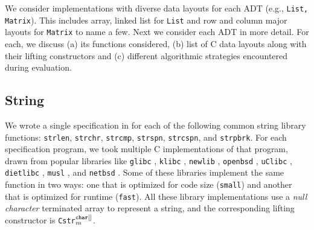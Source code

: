 We consider implementations with diverse data layouts
for each \SpecL{} ADT (e.g., {\tt List, Matrix}).
This includes array, linked list for {\tt List} and
row and column major layouts for {\tt Matrix} to name a few.
Next we consider each ADT in more detail. For each, we discuss
(a) its functions considered, (b) list of C data layouts along with
their lifting constructors and (c) different algorithmic strategies
encountered during evaluation.




\subsection{String} We wrote a single specification in \SpecL{} for each of the
following
common string library functions: {\tt strlen}, {\tt strchr}, {\tt strcmp}, {\tt strspn},
{\tt strcspn}, and {\tt strpbrk}.  For each specification
program, we took multiple C implementations of that program, drawn from popular
libraries like {\tt glibc} \cite{glibc}, {\tt klibc} \cite{klibc}, {\tt newlib} \cite{newlib},
{\tt openbsd} \cite{openbsdlibc}, {\tt uClibc} \cite{uclibc},
{\tt dietlibc} \cite{dietlibc}, {\tt musl} \cite{musl}, and {\tt netbsd} \cite{netbsd}.
Some of these libraries implement the same function in two ways: one that is optimized
for code size ({\tt small}) and another that is optimized for runtime ({\tt fast}).
All these library implementations use a {\em null character} terminated array to represent
a string, and the
corresponding lifting constructor is {\tt Cstr}$^{\tt char[]}_m$.

